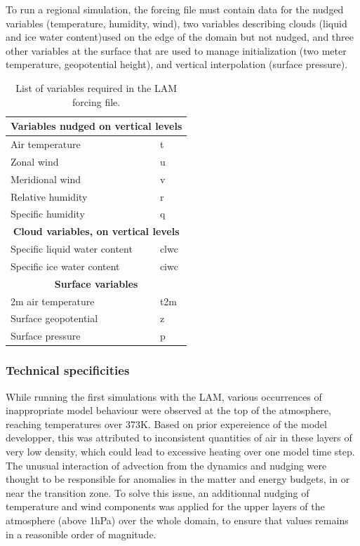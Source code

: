 To run a regional simulation, the forcing file must contain data for the nudged variables (temperature, humidity, wind), two variables describing clouds (liquid and ice water content)used on the edge of the domain but not nudged, and three other variables at the surface that are used to manage initialization (two meter temperature, geopotential height), and vertical interpolation (surface pressure).

\begin{table}[htbp]
\centering
\begin{tabular}{|l|l|}
\hline
\multicolumn{2}{|c|}{\textbf{Variables nudged on vertical levels}} \\ \hline
Air temperature                & t     \\ \hline
Zonal wind                    & u     \\ \hline
Meridional wind               & v     \\ \hline
Relative humidity             & r     \\ \hline
Specific humidity             & q     \\ \hline
\multicolumn{2}{|c|}{\textbf{Cloud variables, on vertical levels}} \\ \hline
Specific liquid water content & clwc  \\ \hline
Specific ice water content    & ciwc  \\ \hline
\multicolumn{2}{|c|}{\textbf{Surface variables}} \\ \hline
2m air temperature            & t2m   \\ \hline
Surface geopotential          & z     \\ \hline
Surface pressure              & p     \\ \hline
\end{tabular}
\caption{List of variables required in the LAM forcing file.}
\end{table}


\subsubsection{Technical specificities}

While running the first simulations with the LAM, various occurrences of inappropriate model behaviour were observed at the top of the atmosphere, reaching temperatures over 373K. Based on prior expereience of the model developper, this was attributed to inconsistent quantities of air in these layers of very low density, which could lead to excessive heating over one model time step. The unusual interaction of advection from the dynamics and nudging were thought to be responsible for anomalies in the matter and energy budgets, in or near the transition zone.
To solve this issue, an additionnal nudging of temperature and wind components was applied for the upper layers of the atmosphere (above 1hPa) over the whole domain, to ensure that values remains in a reasonible order of magnitude. 

